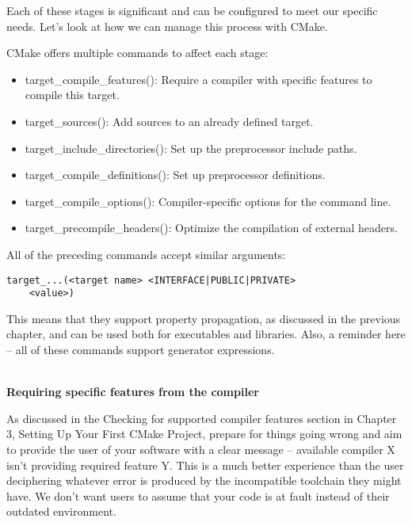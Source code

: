 Each of these stages is significant and can be configured to meet our specific needs. Let's look at how we can manage this process with CMake.


CMake offers multiple commands to affect each stage:

\begin{itemize}
\item 
target\_compile\_features(): Require a compiler with specific features to compile this target.

\item 
target\_sources(): Add sources to an already defined target.

\item 
target\_include\_directories(): Set up the preprocessor include paths.

\item 
target\_compile\_definitions(): Set up preprocessor definitions.

\item 
target\_compile\_options(): Compiler-specific options for the command line.

\item 
target\_precompile\_headers(): Optimize the compilation of external headers.
\end{itemize}

All of the preceding commands accept similar arguments:

\begin{lstlisting}[style=styleCMake]
target_...(<target name> <INTERFACE|PUBLIC|PRIVATE>
	<value>)
\end{lstlisting}

This means that they support property propagation, as discussed in the previous chapter, and can be used both for executables and libraries. Also, a reminder here – all of these commands support generator expressions.

\hspace*{\fill} \\ %
\noindent
\textbf{Requiring specific features from the compiler}

As discussed in the Checking for supported compiler features section in Chapter 3, Setting Up Your First CMake Project, prepare for things going wrong and aim to provide the user of your software with a clear message – available compiler X isn't providing required feature Y. This is a much better experience than the user deciphering whatever error is produced by the incompatible toolchain they might have. We don't want users to assume that your code is at fault instead of their outdated environment.

